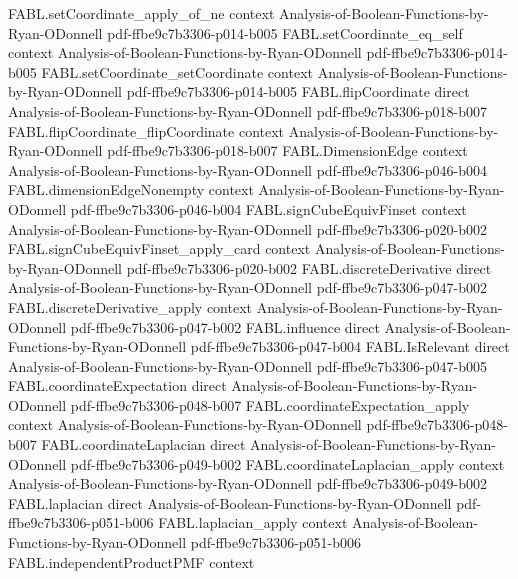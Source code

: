 \begin{theorem}
\proofstep
  {FABL.setCoordinate_apply_of_ne}
  {context}
  {Analysis-of-Boolean-Functions-by-Ryan-ODonnell}
  {pdf-ffbe9c7b3306-p014-b005}
\proofstep
  {FABL.setCoordinate_eq_self}
  {context}
  {Analysis-of-Boolean-Functions-by-Ryan-ODonnell}
  {pdf-ffbe9c7b3306-p014-b005}
\proofstep
  {FABL.setCoordinate_setCoordinate}
  {context}
  {Analysis-of-Boolean-Functions-by-Ryan-ODonnell}
  {pdf-ffbe9c7b3306-p014-b005}
\proofstep
  {FABL.flipCoordinate}
  {direct}
  {Analysis-of-Boolean-Functions-by-Ryan-ODonnell}
  {pdf-ffbe9c7b3306-p018-b007}
\proofstep
  {FABL.flipCoordinate_flipCoordinate}
  {context}
  {Analysis-of-Boolean-Functions-by-Ryan-ODonnell}
  {pdf-ffbe9c7b3306-p018-b007}
\proofstep
  {FABL.DimensionEdge}
  {context}
  {Analysis-of-Boolean-Functions-by-Ryan-ODonnell}
  {pdf-ffbe9c7b3306-p046-b004}
\proofstep
  {FABL.dimensionEdgeNonempty}
  {context}
  {Analysis-of-Boolean-Functions-by-Ryan-ODonnell}
  {pdf-ffbe9c7b3306-p046-b004}
\proofstep
  {FABL.signCubeEquivFinset}
  {context}
  {Analysis-of-Boolean-Functions-by-Ryan-ODonnell}
  {pdf-ffbe9c7b3306-p020-b002}
\proofstep
  {FABL.signCubeEquivFinset_apply_card}
  {context}
  {Analysis-of-Boolean-Functions-by-Ryan-ODonnell}
  {pdf-ffbe9c7b3306-p020-b002}
\proofstep
  {FABL.discreteDerivative}
  {direct}
  {Analysis-of-Boolean-Functions-by-Ryan-ODonnell}
  {pdf-ffbe9c7b3306-p047-b002}
\proofstep
  {FABL.discreteDerivative_apply}
  {context}
  {Analysis-of-Boolean-Functions-by-Ryan-ODonnell}
  {pdf-ffbe9c7b3306-p047-b002}
\proofstep
  {FABL.influence}
  {direct}
  {Analysis-of-Boolean-Functions-by-Ryan-ODonnell}
  {pdf-ffbe9c7b3306-p047-b004}
\proofstep
  {FABL.IsRelevant}
  {direct}
  {Analysis-of-Boolean-Functions-by-Ryan-ODonnell}
  {pdf-ffbe9c7b3306-p047-b005}
\proofstep
  {FABL.coordinateExpectation}
  {direct}
  {Analysis-of-Boolean-Functions-by-Ryan-ODonnell}
  {pdf-ffbe9c7b3306-p048-b007}
\proofstep
  {FABL.coordinateExpectation_apply}
  {context}
  {Analysis-of-Boolean-Functions-by-Ryan-ODonnell}
  {pdf-ffbe9c7b3306-p048-b007}
\proofstep
  {FABL.coordinateLaplacian}
  {direct}
  {Analysis-of-Boolean-Functions-by-Ryan-ODonnell}
  {pdf-ffbe9c7b3306-p049-b002}
\proofstep
  {FABL.coordinateLaplacian_apply}
  {context}
  {Analysis-of-Boolean-Functions-by-Ryan-ODonnell}
  {pdf-ffbe9c7b3306-p049-b002}
\proofstep
  {FABL.laplacian}
  {direct}
  {Analysis-of-Boolean-Functions-by-Ryan-ODonnell}
  {pdf-ffbe9c7b3306-p051-b006}
\proofstep
  {FABL.laplacian_apply}
  {context}
  {Analysis-of-Boolean-Functions-by-Ryan-ODonnell}
  {pdf-ffbe9c7b3306-p051-b006}
\proofstep
  {FABL.independentProductPMF}
  {context}

\end{theorem}
